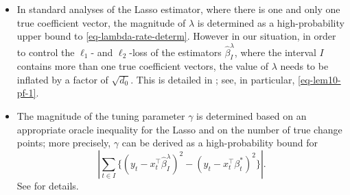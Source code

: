 \documentclass[twoside]{article}
\begin{document}
	\begin{itemize}
		\item In standard analyses of the Lasso estimator, where there is one and only one true coefficient vector, the magnitude of $\lambda$ is determined as a high-probability upper bound to \eqref{eq-lambda-rate-determ}.  However in our situation, in order to control the $\ell_1$- and $\ell_2$-loss of the estimators $\widehat{\beta}^{\lambda}_I$, where the interval $I$ contains more than one true coefficient vectors, the value of $\lambda$ needs to be inflated by a factor of $\sqrt{d_0}$.  This is detailed in ; see, in particular, \eqref{eq-lem10-pf-1}.
		\item The magnitude of the tuning parameter $\gamma$ is determined based on an appropriate oracle inequality for the Lasso and on the number of true change points; more precisely, $\gamma$ can be derived as a high-probability bound for 
			\[
				\left|\sum_{t \in I} \bigl\{(y_t - x_t^{\top}\widehat{\beta}^{\lambda}_I)^2 - (y_t - x_t^{\top}\beta_t^*)^2\bigr\}\right|.
			\]
			See  for details.
			

\end{itemize}
\end{document}

